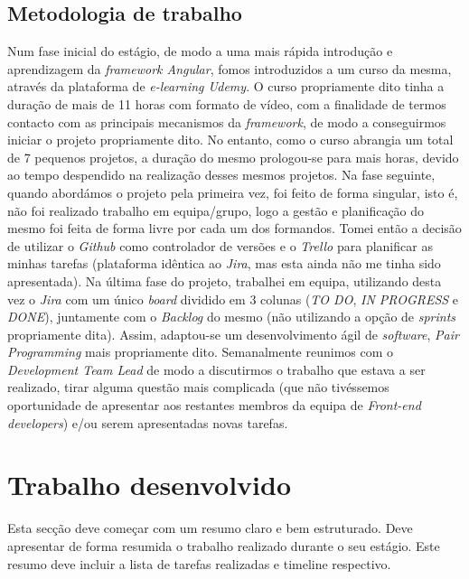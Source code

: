 \documentclass{article}
\begin{document}
\subsection{Metodologia de trabalho}
\hspace*{0.5cm} Num fase inicial do estágio, de modo a uma mais rápida introdução e aprendizagem da \emph{framework Angular}, fomos introduzidos a um curso da mesma, através da plataforma de \emph{e-learning Udemy}. O curso propriamente dito tinha a duração de mais de 11 horas com formato de vídeo, com a finalidade de termos contacto com as principais mecanismos da \emph{framework}, de modo a conseguirmos iniciar o projeto propriamente dito. No entanto, como o curso abrangia um total de 7 pequenos projetos, a duração do mesmo prologou-se para mais horas, devido ao tempo despendido na realização desses mesmos projetos. \newline
\hspace*{0.5cm} Na fase seguinte, quando abordámos o projeto pela primeira vez, foi feito de forma singular, isto é, não foi realizado trabalho em equipa/grupo, logo a gestão e planificação do mesmo foi feita de forma livre por cada um dos formandos. Tomei então a decisão de utilizar o \emph{Github} como controlador de versões e o \emph{Trello} para planificar as minhas tarefas (plataforma idêntica ao \emph{Jira}, mas esta ainda não me tinha sido apresentada). \newline
\hspace*{0.5cm} Na última fase do projeto, trabalhei em equipa, utilizando desta vez o \emph{Jira} com um único \emph{board} dividido em 3 colunas (\emph{TO DO}, \emph{IN PROGRESS} e \emph{DONE}), juntamente com o \emph{Backlog} do mesmo (não utilizando a opção de \emph{sprints} propriamente dita). Assim, adaptou-se um desenvolvimento ágil de \emph{software}, \emph{Pair Programming} mais propriamente dito. \newline
\hspace*{0.5cm} Semanalmente reunimos com o \emph{Development Team Lead} de modo a discutirmos o trabalho que estava a ser realizado, tirar alguma questão mais complicada (que não tivéssemos oportunidade de apresentar aos restantes membros da equipa de \emph{Front-end developers}) e/ou serem apresentadas novas tarefas. \newline

\cleardoublepage
\section{Trabalho desenvolvido}
\label{sec:trab-dev}
Esta secção deve começar com um resumo claro e bem estruturado. Deve apresentar de forma resumida o trabalho realizado durante o seu estágio. Este resumo deve incluir a lista de tarefas realizadas e timeline respectivo.
\end{document}
